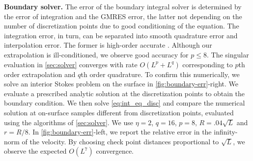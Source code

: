 \textbf{Boundary solver. }
The error of the boundary integral solver is determined
by the error of integration and the GMRES error, the latter not depending on the number of discretization points due to good conditioning of the equation.  The integration error, in turn, can be separated into smooth quadrature error and interpolation error. The former is  high-order accurate \cite{trefethen2013approximation}.
Although our extrapolation is ill-conditioned, we observe good accuracy for $p\leq 8$. The singular evaluation in \cref{sec:solver} converges with rate
$O(L^p + L^q)$ corresponding to $p$th order extrapolation and $q$th
order quadrature.
To confirm this numerically, we solve an interior Stokes problem on the
surface in \cref{fig:boundary-err}-right.
We evaluate a prescribed analytic solution at the discretization
points to obtain the boundary condition.
We then solve \cref{eq:int_eq_disc} and compare the numerical
solution at on-surface samples different from discretization points, evaluated using the algorithms of \cref{sec:solver}. 
We use $\eta =2$, $q=16$, $p=8$, $R=.04\sqrt{L}$ and $r = R/8$.
In \cref{fig:boundary-err}-left, we report the relative error in the
infinity-norm of the velocity.
By choosing check point distances proportional to $\sqrt{L}$,
we observe the expected $O(L^7)$ convergence.
\begin{figure}[h]
  \centering
{}

\end{figure}

